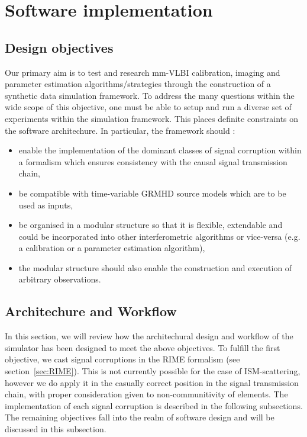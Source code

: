 \chapter{Software implementation}\label{chap:imp}

\section{Design objectives}\label{sec:des_obj}
Our primary aim is to test and research mm-VLBI calibration, imaging and parameter estimation algorithms/strategies through the construction of a synthetic data simulation framework. To address the many questions within the wide scope of this objective, one must be able to setup and run a diverse set of experiments within the simulation framework. This places definite constraints on the software architechure. In particular, the framework should :


\begin{itemize}
 \item enable the implementation of the dominant classes of signal corruption within a formalism which ensures consistency with the causal signal transmission chain,
 \item be compatible with time-variable GRMHD source models which are to be used as inputs,
 \item be organised in a modular structure so that it is flexible, extendable and could be incorporated into other interferometric algorithms or vice-versa (e.g. a calibration or a parameter estimation algorithm),
 \item the modular structure should also enable the construction and execution of arbitrary observations.
\end{itemize}

\section{Architechure and Workflow}\label{sec:arch}
In this section, we will review how the architechural design and workflow of the simulator has been designed to meet the above objectives. To fulfill the first objective, we cast signal corruptions in the RIME formalism (see section~\ref{sec:RIME}). This is not currently possible for the case of ISM-scattering, however we do apply it in the casually correct position in the signal transmission chain, with proper consideration given to non-communitivity of elements. The implementation of each signal corruption is described in the following subsections. The remaining objectives fall into the realm of software design and will be discussed in this subsection. 


